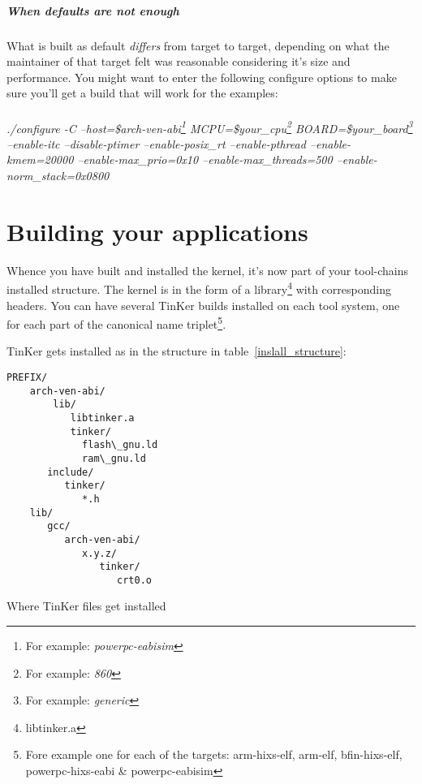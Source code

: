 \paragraph{When defaults are not enough}
What is built as default \textit{differs} from target to target, depending on what the maintainer of that target felt was reasonable considering it's size and performance. You might want to enter the following configure options to make sure you'll get a build that will work for the examples:
\\\\
\textit{./configure -C --host=\$arch-ven-abi\footnote{For example: \textit{powerpc-eabisim}} MCPU=\$your\_cpu\footnote{For example: \textit{860}} BOARD=\$your\_board\footnote{For example: \textit{generic}} --enable-itc --disable-ptimer --enable-posix\_rt --enable-pthread --enable-kmem=20000 --enable-max\_prio=0x10 --enable-max\_threads=500 --enable-norm\_stack=0x0800}




\chapter{Building your applications}
Whence you have built and installed the kernel, it's now part of your tool-chains installed structure. The kernel is in the form of a library\footnote{libtinker.a} with corresponding headers. You can have several TinKer builds installed on each tool system, one for each part of the canonical name triplet\footnote{Fore example one for each of the targets: arm-hixs-elf, arm-elf, bfin-hixs-elf, powerpc-hixs-eabi \& powerpc-eabisim}.

TinKer gets installed as in the structure in table~\ref{inslall_structure}:



\begin{table}[!hbp]

\begin{verbatim}
PREFIX/
    arch-ven-abi/
        lib/
           libtinker.a
           tinker/
             flash\_gnu.ld
             ram\_gnu.ld
       include/
          tinker/
             *.h
    lib/
       gcc/
          arch-ven-abi/
             x.y.z/
                tinker/
                   crt0.o
\end{verbatim}
\caption{Where TinKer files get installed}\label{inslall_structure}
\end{table}

